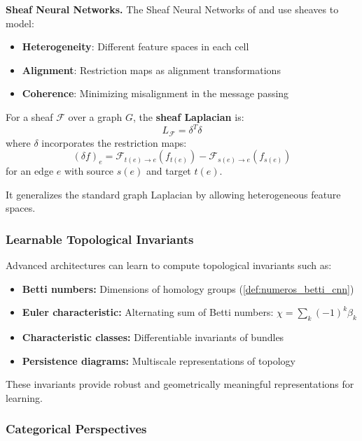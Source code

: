 \textbf{Sheaf Neural Networks.}\label{rem:sheaf_nns} The Sheaf Neural Networks of \citet{hansen2021sheaf} and \citet{bodnar2023cellular} use sheaves to model:
\begin{itemize}
    \item \textbf{Heterogeneity}: Different feature spaces in each cell
    \item \textbf{Alignment}: Restriction maps as alignment transformations
    \item \textbf{Coherence}: Minimizing misalignment in the message passing
\end{itemize}

\begin{example}\label{ex:sheaf_laplacian}
For a sheaf $\mathcal{F}$ over a graph $G$, the \textbf{sheaf Laplacian} is:
\[L_{\mathcal{F}} = \delta^T \delta\]
where $\delta$ incorporates the restriction maps:
\[(\delta f)_e = \mathcal{F}_{t(e) \to e}(f_{t(e)}) - \mathcal{F}_{s(e) \to e}(f_{s(e)})\]
for an edge $e$ with source $s(e)$ and target $t(e)$.

It generalizes the standard graph Laplacian by allowing heterogeneous feature spaces.
\end{example}

\subsubsection{Learnable Topological Invariants}

Advanced architectures can learn to compute topological invariants such as:
\begin{itemize}
    \item \textbf{Betti numbers:} Dimensions of homology groups (\autoref{def:numeros_betti_cnn})
    \item \textbf{Euler characteristic:} Alternating sum of Betti numbers: $\chi = \sum_k (-1)^k \beta_k$
    \item \textbf{Characteristic classes:} Differentiable invariants of bundles
    \item \textbf{Persistence diagrams:} Multiscale representations of topology
\end{itemize}

These invariants provide robust and geometrically meaningful representations for learning.

\subsubsection{Categorical Perspectives}

